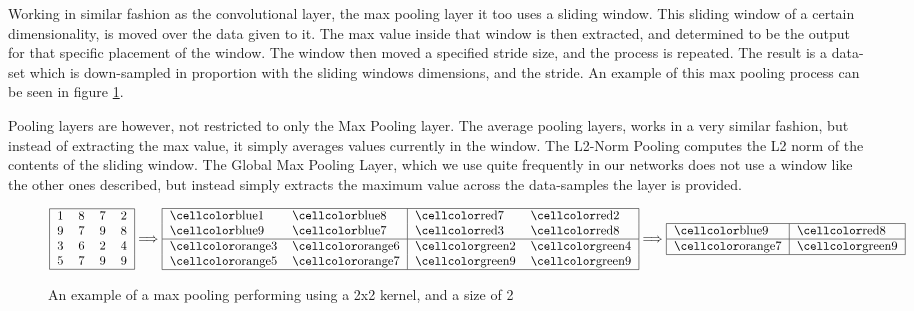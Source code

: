 \begin{description}
        Working in similar fashion as the convolutional layer, the max pooling
        layer it too uses a sliding window. This sliding window of a certain
        dimensionality, is moved over the data given to it. The max value inside
        that window is then extracted, and determined to be the output for that
        specific placement of the window. The window then moved a specified
        stride size, and the process is repeated. The result is a data-set which
        is down-sampled in proportion with the sliding windows dimensions, and
        the stride. An example of this max pooling process can be seen
        in figure \ref{fig:max_pool}.

        Pooling layers are however, not restricted to only the Max Pooling
        layer. The average pooling layers, works in a very similar fashion, but
        instead of extracting the max value, it simply averages values currently
        in the window. The L2-Norm Pooling computes the L2 norm of the contents
        of the sliding window. The Global Max Pooling Layer, which we use quite
        frequently in our networks does not use a window like the other ones
        described, but instead simply extracts the maximum value across the
        data-samples the layer is provided.

    \begin{figure}
    \centering
    \begin{equation}
        \begin{tabular}{|llll|}
        \hline
        1 & 8 & 7 & 2 \\ 
        9 & 7 & 9 & 8 \\ 
        3 & 6 & 2 & 4 \\ 
        5 & 7 & 9 & 9 \\\hline
        \end{tabular}
            \Longrightarrow
        \begin{tabular}{|ll|ll|}
        \hline
        \cc{blue}1 & \cc{blue}8 & \cc{red}7 & \cc{red}2 \\
        \cc{blue}9 & \cc{blue}7 & \cc{red}3 & \cc{red}8 \\ \hline
        \cc{orange}3 & \cc{orange}6 & \cc{green}2 & \cc{green}4 \\
        \cc{orange}5 & \cc{orange}7 & \cc{green}9 & \cc{green}9\\
        \hline
        \end{tabular}
            \Longrightarrow
        \begin{tabular}{|l|l|}
        \hline
        \cc{blue}9 & \cc{red}8\\\hline
        \cc{orange}7 & \cc{green}9\\
        \hline
        \end{tabular}
    \end{equation}
    \caption{An example of a max pooling performing using a 2x2 kernel, and a
    size of 2}
    \label{fig:max_pool}
    \end{figure}

\end{description}

